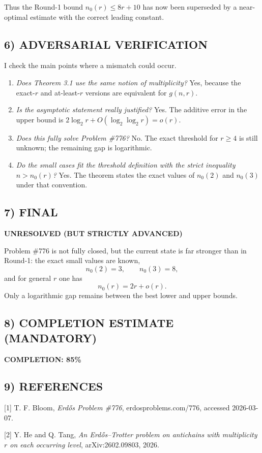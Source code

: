 Thus the Round-1 bound $n_0(r)\le 8r+10$ has now been superseded by a near-optimal estimate with the correct leading constant.

\subsection*{6) ADVERSARIAL VERIFICATION}
I check the main points where a mismatch could occur.

\begin{enumerate}
\item \emph{Does Theorem 3.1 use the same notion of multiplicity?} Yes, because the exact-$r$ and at-least-$r$ versions are equivalent for $g(n,r)$.

\item \emph{Is the asymptotic statement really justified?} Yes. The additive error in the upper bound is $2\log_2 r+O(\log_2\log_2 r)=o(r)$.

\item \emph{Does this fully solve Problem \#776?} No. The exact threshold for $r\ge 4$ is still unknown; the remaining gap is logarithmic.

\item \emph{Do the small cases fit the threshold definition with the strict inequality $n>n_0(r)$?} Yes. The theorem states the exact values of $n_0(2)$ and $n_0(3)$ under that convention.
\end{enumerate}

\subsection*{7) FINAL}
\textbf{UNRESOLVED (BUT STRICTLY ADVANCED)}

Problem \#776 is not fully closed, but the current state is far stronger than in Round-1: the exact small values are known,
\[
 n_0(2)=3,\qquad n_0(3)=8,
\]
and for general $r$ one has
\[
 n_0(r)=2r+o(r).
\]
Only a logarithmic gap remains between the best lower and upper bounds.

\subsection*{8) COMPLETION ESTIMATE (MANDATORY)}
\textbf{COMPLETION: 85\%}

\subsection*{9) REFERENCES}
[1] T. F. Bloom, \emph{Erd\H{o}s Problem \#776}, erdosproblems.com/776, accessed 2026-03-07.

[2] Y. He and Q. Tang, \emph{An Erd\H{o}s--Trotter problem on antichains with multiplicity $r$ on each occurring level}, arXiv:2602.09803, 2026.
